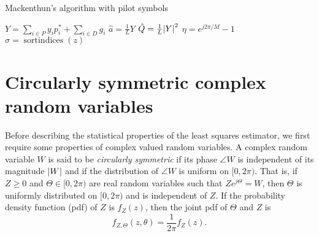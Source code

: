 \documentclass[journal]{IEEEtran}
\begin{document}
\begin{algorithm}[t] \label{alg:loglinear}
\SetAlCapFnt{\small}
\SetAlTitleFnt{}
\caption{Mackenthun's algorithm with pilot symbols}
\DontPrintSemicolon
{}
$Y = \sum_{i \in P} y_i p_i^* + \sum_{i \in D} g_i $ \;
$\hat{a} = \frac{1}{L} Y$  \;
$\hat{Q} = \frac{1}{L}{\left\vert Y \right\vert}^2$  \;
$\eta = e^{j2\pi/M} - 1$ \;
$\sigma = \operatorname{sortindices}(z)$  \;
\end{algorithm}


\section{Circularly symmetric complex random variables}\label{sec:circ-symm-compl}

Before describing the statistical properties of the least squares estimator, we first require some properties of complex valued random variables.  A complex random variable $W$ is said to be \emph{circularly symmetric} if its phase $\angle{W}$ is independent of its magnitude ${\left\vert W \right\vert}$ and if the distribution of $\angle{W}$ is uniform on $[0,2\pi)$.  That is, if $Z \geq 0$ and $\Theta \in [0,2\pi)$ are real random variables such that $Ze^{j\Theta} = W$, then $\Theta$ is uniformly distributed on $[0,2\pi)$ and is independent of $Z$.  If the probability density function (pdf) of $Z$ is $f_Z(z)$, then the joint pdf of $\Theta$ and $Z$ is 
\[
f_{Z,\Theta}(z,\theta) = \frac{1}{2\pi}f_Z(z).
\]
\end{document}
